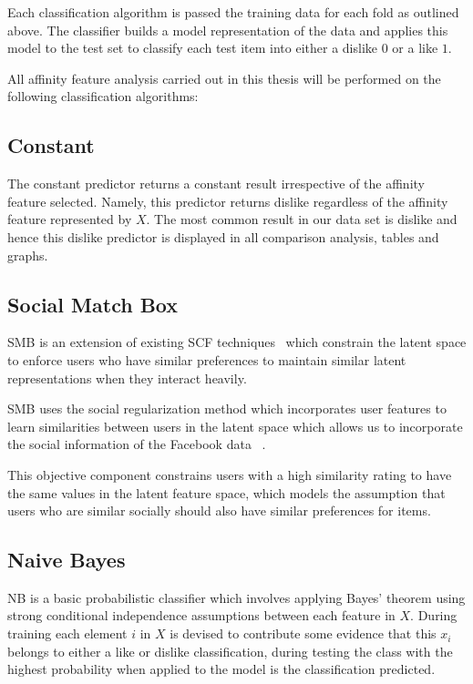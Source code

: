 Each classification algorithm is passed the training data for each fold as outlined above. The classifier 
builds a model representation of the data and applies this model to the test set to classify each test item into either a dislike $0$ or 
a like $1$.

All affinity feature analysis carried out in this thesis will be performed on the following classification algorithms:

\subsection{Constant}
\label{sec:const}

The constant predictor returns a constant result irrespective of the affinity feature selected. Namely, this predictor returns dislike
regardless of the affinity feature represented by $X$. The most common result in our data set is dislike and hence this dislike 
predictor is displayed in all comparison analysis, tables and graphs.

\subsection{Social Match Box}
\label{sec:sr}

SMB is an extension of existing SCF techniques~\cite{lla,socinf} which constrain the latent space to enforce users 
who have similar preferences to maintain similar latent representations when they interact heavily.

SMB uses the social regularization method which incorporates user features to learn
similarities between users in the latent space which allows us to incorporate the social information of the Facebook data ~\cite{joseph}.

This objective component constrains users with a high similarity rating to have the same values in the latent feature space, which
models the assumption that users who are similar socially should also have similar preferences for items.

\subsection{Naive Bayes}
\label{sec:nb}

NB is a basic probabilistic classifier which involves applying Bayes' theorem using strong conditional independence 
assumptions between each feature in $X$. During training each element $i$ in $X$ is devised to contribute some 
evidence that this $x_i$ belongs to either a like or dislike classification, during testing the class with the highest probability 
when applied to the model is the classification predicted. 

